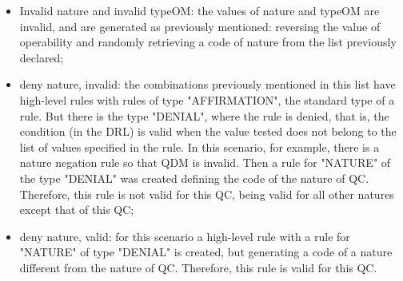 \begin{itemize}

\item Invalid nature and invalid typeOM: the values of nature and typeOM are invalid, and are generated as previously mentioned: reversing the value of operability and randomly retrieving a code of nature from the list previously declared;


\item deny nature, invalid: the combinations previously mentioned in this list have high-level rules with rules of type "AFFIRMATION", the standard type of a rule. But there is the type "DENIAL", where the rule is denied, that is, the condition (in the DRL) is valid when the value tested does not belong to the list of values specified in the rule. In this scenario, for example, there is a nature negation rule so that QDM is invalid. Then a rule for "NATURE" of the type "DENIAL" was created defining the code of the nature of QC. Therefore, this rule is not valid for this QC, being valid for all other natures except that of this QC;


\item deny nature, valid: for this scenario a high-level rule with a rule for "NATURE" of type "DENIAL" is created, but generating a code of a nature different from the nature of QC. Therefore, this rule is valid for this QC.
\end{itemize}

